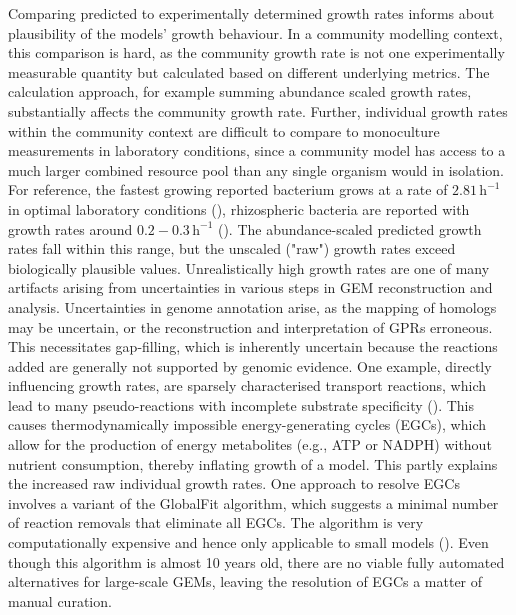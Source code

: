 Comparing predicted to experimentally determined growth rates informs about plausibility of the models’ growth behaviour. In a community modelling context, this comparison is hard, as the community growth rate is not one experimentally measurable quantity but calculated based on different underlying metrics. The calculation approach, for example summing abundance scaled growth rates, substantially affects the community growth rate. Further, individual growth rates within the community context are difficult to compare to monoculture measurements in laboratory conditions, since a community model has access to a much larger combined resource pool than any single organism would in isolation. For reference, the fastest growing reported bacterium grows at a rate of $2.81 \,\text{h}^{-1}$ in optimal laboratory conditions (\cite{lee_functional_2019, lieven_memote_2020}), rhizospheric bacteria are reported with growth rates around $0.2-0.3 \,\text{h}^{-1}$ (\cite{lopez_growth_2023}). The abundance-scaled predicted growth rates fall within this range, but the unscaled ("raw") growth rates exceed biologically plausible values. Unrealistically high growth rates are one of many artifacts arising from uncertainties in various steps in GEM reconstruction and analysis. Uncertainties in genome annotation arise, as the mapping of homologs may be uncertain, or the reconstruction and interpretation of GPRs erroneous. This necessitates gap-filling, which is inherently uncertain because the reactions added are generally not supported by genomic evidence. One example, directly influencing growth rates, are sparsely characterised transport reactions, which lead to many pseudo-reactions with incomplete substrate specificity (\cite{bernstein_addressing_2021}). This causes thermodynamically impossible energy-generating cycles (EGCs), which allow for the production of energy metabolites (e.g., ATP or NADPH) without nutrient consumption, thereby inflating growth of a model. This partly explains the increased raw individual growth rates. One approach to resolve EGCs involves a variant of the GlobalFit algorithm, which suggests a minimal number of reaction removals that eliminate all EGCs. The algorithm is very computationally expensive and hence only applicable to small models (\cite{fritzemeier_erroneous_2017}). Even though this algorithm is almost 10 years old, there are no viable fully automated alternatives for large-scale GEMs, leaving the resolution of EGCs a matter of manual curation.
\\



